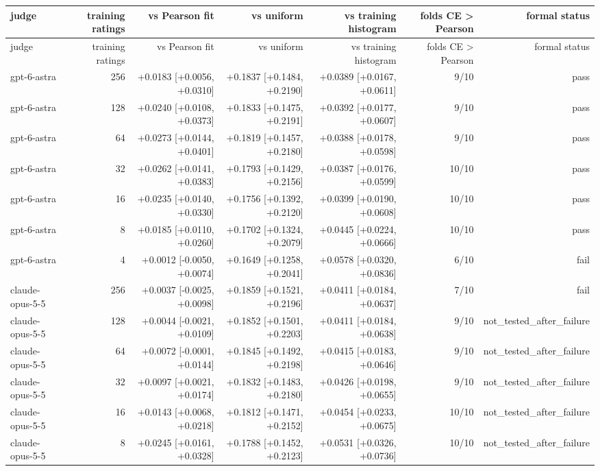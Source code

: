 \begin{longtable}{lrrrrrr}
\toprule
judge & training ratings & vs Pearson fit & vs uniform & vs training histogram & folds CE > Pearson & formal status \\
\midrule
\endfirsthead
\toprule
judge & training ratings & vs Pearson fit & vs uniform & vs training histogram & folds CE > Pearson & formal status \\
\midrule
\endhead
gpt-6-astra & 256 & +0.0183 [+0.0056, +0.0310] & +0.1837 [+0.1484, +0.2190] & +0.0389 [+0.0167, +0.0611] & 9/10 & pass \\
gpt-6-astra & 128 & +0.0240 [+0.0108, +0.0373] & +0.1833 [+0.1475, +0.2191] & +0.0392 [+0.0177, +0.0607] & 9/10 & pass \\
gpt-6-astra & 64 & +0.0273 [+0.0144, +0.0401] & +0.1819 [+0.1457, +0.2180] & +0.0388 [+0.0178, +0.0598] & 9/10 & pass \\
gpt-6-astra & 32 & +0.0262 [+0.0141, +0.0383] & +0.1793 [+0.1429, +0.2156] & +0.0387 [+0.0176, +0.0599] & 10/10 & pass \\
gpt-6-astra & 16 & +0.0235 [+0.0140, +0.0330] & +0.1756 [+0.1392, +0.2120] & +0.0399 [+0.0190, +0.0608] & 10/10 & pass \\
gpt-6-astra & 8 & +0.0185 [+0.0110, +0.0260] & +0.1702 [+0.1324, +0.2079] & +0.0445 [+0.0224, +0.0666] & 10/10 & pass \\
gpt-6-astra & 4 & +0.0012 [-0.0050, +0.0074] & +0.1649 [+0.1258, +0.2041] & +0.0578 [+0.0320, +0.0836] & 6/10 & fail \\
claude-opus-5-5 & 256 & +0.0037 [-0.0025, +0.0098] & +0.1859 [+0.1521, +0.2196] & +0.0411 [+0.0184, +0.0637] & 7/10 & fail \\
claude-opus-5-5 & 128 & +0.0044 [-0.0021, +0.0109] & +0.1852 [+0.1501, +0.2203] & +0.0411 [+0.0184, +0.0638] & 9/10 & not\_tested\_after\_failure \\
claude-opus-5-5 & 64 & +0.0072 [-0.0001, +0.0144] & +0.1845 [+0.1492, +0.2198] & +0.0415 [+0.0183, +0.0646] & 9/10 & not\_tested\_after\_failure \\
claude-opus-5-5 & 32 & +0.0097 [+0.0021, +0.0174] & +0.1832 [+0.1483, +0.2180] & +0.0426 [+0.0198, +0.0655] & 9/10 & not\_tested\_after\_failure \\
claude-opus-5-5 & 16 & +0.0143 [+0.0068, +0.0218] & +0.1812 [+0.1471, +0.2152] & +0.0454 [+0.0233, +0.0675] & 10/10 & not\_tested\_after\_failure \\
claude-opus-5-5 & 8 & +0.0245 [+0.0161, +0.0328] & +0.1788 [+0.1452, +0.2123] & +0.0531 [+0.0326, +0.0736] & 10/10 & not\_tested\_after\_failure \\

\end{longtable}
